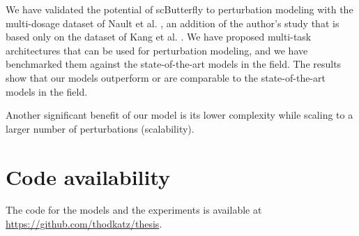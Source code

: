 \documentclass[12pt, a4paper]{article}
\begin{document}
We have validated the potential of scButterfly to perturbation modeling with the multi-dosage dataset of Nault et al. \cite{nault2021single,nault2022benchmarking}, an addition of the author's study that is based only on the dataset of Kang et al. \cite{kanaGenerativeModelingSinglecell2023}. We have proposed multi-task architectures that can be used for perturbation modeling, and we have benchmarked them against the state-of-the-art models in the field. The results show that our models outperform or are comparable to the state-of-the-art models in the field.

Another significant benefit of our model is its lower complexity while scaling to a larger number of perturbations (scalability)\cite{allenspachNeuralMultitaskLearning2024}.


\section{Code availability}

The code for the models and the experiments is available at \url{https://github.com/thodkatz/thesis}.

\clearpage


%




\appendix
\end{document}
